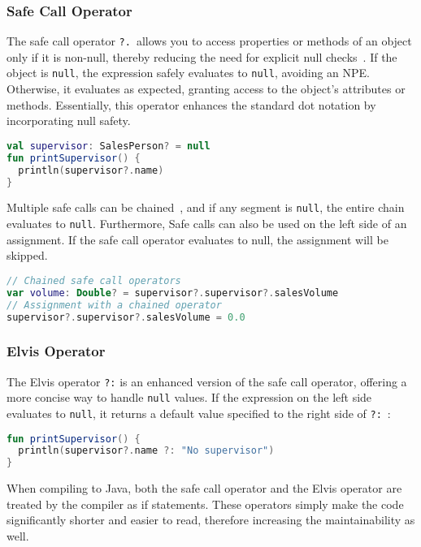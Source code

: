 \documentclass[a4paper,11pt]{article}
\begin{document}
\subsubsection{Safe Call Operator}
The safe call operator \texttt{?.}~allows you to access properties or methods of an object only if it is non-null, thereby reducing the need for explicit null checks~\cite{nullsafety-safe-call}.
If the object is \texttt{null}, the expression safely evaluates to \texttt{null}, avoiding an NPE\@.
Otherwise, it evaluates as expected, granting access to the object's attributes or methods.
Essentially, this operator enhances the standard dot notation by incorporating null safety. 

\begin{lstlisting}[language=Kotlin]
val supervisor: SalesPerson? = null
fun printSupervisor() {
  println(supervisor?.name)
}
\end{lstlisting}

Multiple safe calls can be chained~\cite{nullsafety-safe-call}, and if any segment is \texttt{null}, the entire chain evaluates to \texttt{null}.
Furthermore, Safe calls can also be used on the left side of an assignment. If the safe call operator evaluates to null, the assignment will be skipped.

\begin{lstlisting}[language=Kotlin]
// Chained safe call operators
var volume: Double? = supervisor?.supervisor?.salesVolume
// Assignment with a chained operator
supervisor?.supervisor?.salesVolume = 0.0
\end{lstlisting}

\subsubsection{Elvis Operator}
The Elvis operator \texttt{?:} is an enhanced version of the safe call operator, offering a more concise way to handle \texttt{null} values. If the expression on the left side evaluates to \texttt{null}, it returns a default value specified to the right side of \texttt{?:}~\cite{nullsafety-elvis}:

\begin{lstlisting}[language=Kotlin]
fun printSupervisor() {
  println(supervisor?.name ?: "No supervisor")
}
\end{lstlisting}

When compiling to Java, both the safe call operator and the Elvis operator are treated by the compiler as if statements. These operators simply make the code significantly shorter and easier to read, therefore increasing the maintainability as well.
\end{document}
